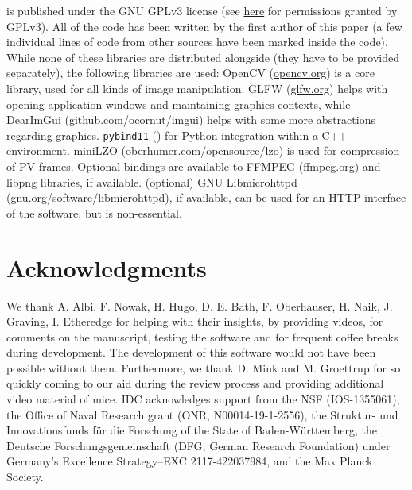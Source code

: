 \documentclass[9pt,lineno]{elife}
\newcommand{\TRex}{\protect\path{TRex}}
\begin{document}
\TRex{} is published under the GNU GPLv3 license (see \href{https://choosealicense.com/licenses/gpl-3.0/}{here} for permissions granted by GPLv3). All of the code has been written by the first author of this paper (a few individual lines of code from other sources have been marked inside the code). While none of these libraries are distributed alongside \TRex{} (they have to be provided separately), the following libraries are used: OpenCV (\href{https://opencv.org/about/}{opencv.org}) is a core library, used for all kinds of image manipulation. GLFW (\href{https://www.glfw.org}{glfw.org}) helps with opening application windows and maintaining graphics contexts, while DearImGui (\href{https://github.com/ocornut/imgui}{github.com/ocornut/imgui}) helps with some more abstractions regarding graphics. \texttt{pybind11} (\cite{pybind11}) for Python integration within a C++ environment. miniLZO (\href{http://www.oberhumer.com/opensource/lzo/\#minilzo}{oberhumer.com/opensource/lzo}) is used for compression of PV frames. Optional bindings are available to FFMPEG (\href{http://ffmpeg.org}{ffmpeg.org}) and libpng libraries, if available. (optional) GNU Libmicrohttpd (\href{https://www.gnu.org/software/libmicrohttpd/}{gnu.org/software/libmicrohttpd}), if available, can be used for an HTTP interface of the software, but is non-essential.

\section{Acknowledgments}

We thank A. Albi, F. Nowak, H. Hugo, D. E. Bath, F. Oberhauser, H. Naik, J. Graving, I. Etheredge for helping with their insights, by providing videos, for comments on the manuscript, testing the software and for frequent coffee breaks during development. The development of this software would not have been possible without them. {\color{blue}Furthermore, we thank D. Mink and M. Groettrup for so quickly coming to our aid during the review process and providing additional video material of mice.} IDC acknowledges support from the NSF (IOS-1355061), the Office of Naval Research grant (ONR, N00014-19-1-2556), the Struktur- und Innovationsfunds f\"{u}r die Forschung of the State of Baden-W\"{u}rttemberg, the Deutsche Forschungsgemeinschaft (DFG, German Research Foundation) under Germany's Excellence Strategy--EXC 2117-422037984, and the Max Planck Society.


\end{document}
